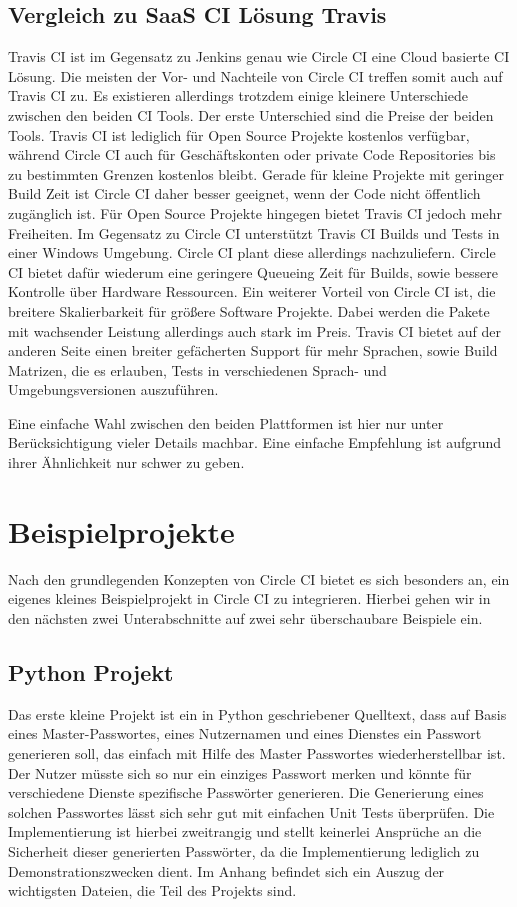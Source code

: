 \documentclass[11pt]{article}
\begin{document}
\subsection {Vergleich zu SaaS CI Lösung Travis}
Travis CI ist im Gegensatz zu Jenkins genau wie Circle CI eine Cloud basierte CI Lösung. Die meisten der Vor- und Nachteile von Circle CI treffen somit auch auf Travis CI zu. Es existieren allerdings trotzdem einige kleinere Unterschiede zwischen den beiden CI Tools. Der erste Unterschied sind die Preise der beiden Tools. Travis CI ist lediglich für Open Source Projekte kostenlos verfügbar, während Circle CI auch für Geschäftskonten oder private Code Repositories bis zu bestimmten Grenzen kostenlos bleibt. Gerade für kleine Projekte mit geringer Build Zeit ist Circle CI daher besser geeignet, wenn der Code nicht öffentlich zugänglich ist. Für Open Source Projekte hingegen bietet Travis CI jedoch mehr Freiheiten. Im Gegensatz zu Circle CI unterstützt Travis CI Builds und Tests in einer Windows Umgebung. Circle CI plant diese allerdings nachzuliefern. Circle CI bietet dafür wiederum eine geringere Queueing Zeit für Builds, sowie bessere Kontrolle über Hardware Ressourcen. Ein weiterer Vorteil von Circle CI ist, die breitere Skalierbarkeit für größere Software Projekte. Dabei werden die Pakete mit wachsender Leistung allerdings auch stark im Preis. Travis CI bietet auf der anderen Seite einen breiter gefächerten Support für mehr Sprachen, sowie Build Matrizen, die es erlauben, Tests in verschiedenen Sprach- und Umgebungsversionen auszuführen.

Eine einfache Wahl zwischen den beiden Plattformen ist hier nur unter Berücksichtigung vieler Details
machbar. Eine einfache Empfehlung ist aufgrund ihrer Ähnlichkeit nur schwer zu geben.

\section{Beispielprojekte}
Nach den grundlegenden Konzepten von Circle CI bietet es sich besonders an, ein eigenes kleines
Beispielprojekt in Circle CI zu integrieren. Hierbei gehen wir in den nächsten zwei Unterabschnitte
auf zwei sehr überschaubare Beispiele ein.

\subsection{Python Projekt}
Das erste kleine Projekt ist ein in Python geschriebener Quelltext, dass auf Basis eines Master-Passwortes, eines Nutzernamen und eines Dienstes ein Passwort generieren soll, das einfach mit Hilfe des Master Passwortes wiederherstellbar ist. Der Nutzer müsste sich so nur ein einziges Passwort merken und könnte für verschiedene Dienste spezifische Passwörter generieren. Die Generierung eines solchen Passwortes lässt sich sehr gut mit einfachen Unit Tests überprüfen. Die Implementierung ist hierbei zweitrangig und stellt keinerlei Ansprüche an die Sicherheit dieser generierten Passwörter, da die Implementierung lediglich zu Demonstrationszwecken dient. Im Anhang befindet sich ein Auszug der wichtigsten Dateien, die Teil des Projekts sind.
\end{document}
